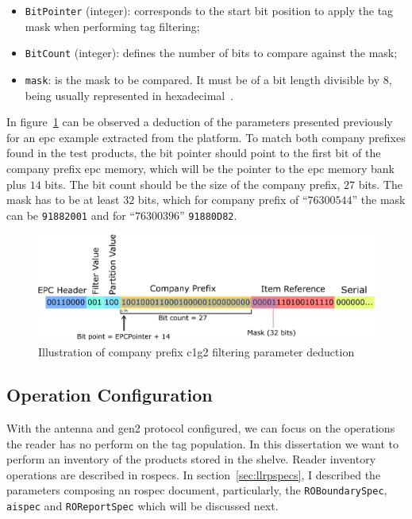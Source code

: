 \begin{itemize}
  \item \texttt{BitPointer} (integer): corresponds to the start bit position to apply the tag mask when performing tag filtering;
  \item \texttt{BitCount} (integer): defines the number of bits to compare against the mask;
  \item \texttt{mask}: is the mask to be compared. It must be of a bit length divisible by $8$, being usually represented in hexadecimal~\cite{LowLevelReader}.
\end{itemize}

In figure~\ref{fig:c1g2filter} can be observed a deduction of the parameters presented previously for an \ac{epc} example extracted from the platform.
To match both company prefixes found in the test products, the bit pointer should point to the first bit of the company prefix \ac{epc} memory, which will be the pointer to the \ac{epc} memory bank plus $14$ bits.
The bit count should be the size of the company prefix, $27$ bits. The mask has to be at least $32$ bits, which for company prefix of ``$76300544$'' the mask can be \texttt{91882001} and for ``$76300396$'' \texttt{91880D82}.

\begin{figure}
  \centering
  \includegraphics[width=\textwidth]{figs/c1g2filter.eps}
  \caption{Illustration of company prefix \ac{c1g2} filtering parameter deduction}
  \label{fig:c1g2filter}
\end{figure}

\subsection{Operation Configuration}

With the antenna and \ac{gen2} protocol configured, we can focus on the operations the reader has no perform on the tag population.
In this dissertation we want to perform an inventory of the products stored in the shelve. Reader inventory operations are described in \acp{rospec}.
In section~\ref{sec:llrpspecs}, I described the parameters composing an \ac{rospec} document, particularly, the \texttt{ROBoundarySpec}, \texttt{\acs{aispec}} and \texttt{ROReportSpec} which will be discussed next.

